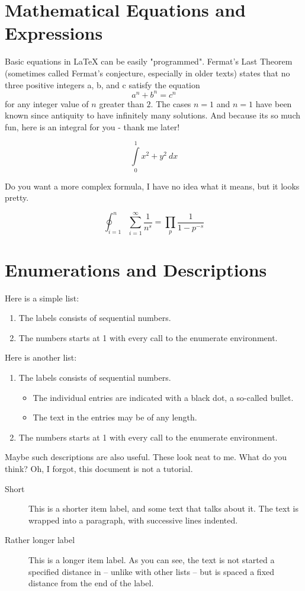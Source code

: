 \documentclass{imc-rai}
\begin{document}
\section{Mathematical Equations and Expressions}
Basic equations in  \LaTeX{} can be easily "programmed". Fermat's Last Theorem (sometimes called Fermat's conjecture, especially in older texts) states that no three positive integers a, b, and c satisfy the equation \[ a^n + b^n = c^n \] for any integer value of $n$ greater than $2$. The cases $n = 1$ and  $n = 1$  have been known since antiquity to have infinitely many solutions. And because its so much fun, here is an integral for you - thank me later!  

\[ \int\limits_0^1 x^2 + y^2 \ dx \]

Do you want a more complex formula, I have no idea what it means, but it looks pretty. 

\[\oint_{i=1}^n \sum_{i=1}^{\infty} \frac{1}{n^s} 
= \prod_p \frac{1}{1 - p^{-s}} \]


\section{Enumerations and Descriptions}
Here is a simple list: 
\begin{enumerate}
	\item The labels consists of sequential numbers.
	\item The numbers starts at 1 with every call to the enumerate environment.
\end{enumerate}

Here is another list: 

\begin{enumerate}
	\item The labels consists of sequential numbers.
	\begin{itemize}
		\item The individual entries are indicated with a black dot, a so-called bullet.
		\item The text in the entries may be of any length.
	\end{itemize}
	\item The numbers starts at 1 with every call to the enumerate environment.
\end{enumerate}

Maybe such descriptions are also useful. These look neat to me. What do you think? Oh, I forgot, this document is not a tutorial. 
\begin{description}
	\item[Short] This is a shorter item label, and some text that talks
	about it. The text is wrapped into a paragraph, with successive
	lines indented.
	\item[Rather longer label] This is a longer item label.  As you can
	see, the text is not started a specified distance in -- unlike
	with other lists -- but is spaced a fixed distance from the end
	of the label.
\end{description}
\end{document}
